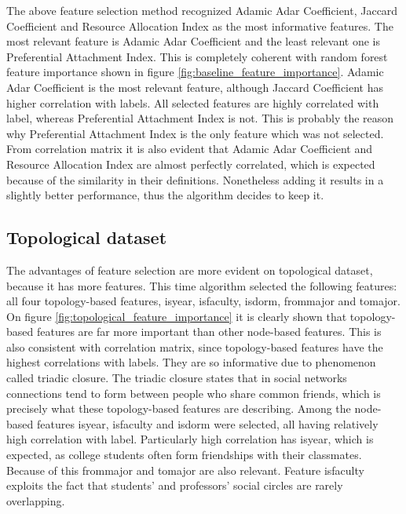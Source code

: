 \documentclass[9pt,twocolumn,twoside]{pnas-new}
\begin{document}
The above feature selection method recognized Adamic Adar Coefficient, Jaccard Coefficient and Resource Allocation Index as the most informative features. The most relevant feature is Adamic Adar Coefficient and the least relevant one is Preferential Attachment Index. This is completely coherent with random forest feature importance shown in figure \ref{fig:baseline_feature_importance}. Adamic Adar Coefficient is the most relevant feature, although Jaccard Coefficient has higher correlation with labels. All selected features are highly correlated with label, whereas Preferential Attachment Index is not. This is probably the reason why Preferential Attachment Index is the only feature which was not selected. From correlation matrix it is also evident that Adamic Adar Coefficient and Resource Allocation Index are almost perfectly correlated, which is expected because of the similarity in their definitions. Nonetheless adding it results in a slightly better performance, thus the algorithm decides to keep it. 








\subsection*{Topological dataset}

The advantages of feature selection are more evident on topological dataset, because it has more features. This time algorithm selected the following features: all four topology-based features, is\textunderscore year, is\textunderscore faculty, is\textunderscore dorm, from\textunderscore major and to\textunderscore major. On figure \ref{fig:topological_feature_importance} it is clearly shown that topology-based features are far more important than other node-based features. This is also consistent with correlation matrix, since topology-based features have the highest correlations with labels. They are so informative due to phenomenon called triadic closure. The triadic closure states that in social networks connections tend to form between people who share common friends, which is precisely what these topology-based features are describing. Among the node-based features is\textunderscore year, is\textunderscore faculty and is\textunderscore dorm were selected, all having relatively high correlation with label. Particularly high correlation has is\textunderscore year, which is expected, as college students often form friendships with their classmates. Because of this from\textunderscore major and to\textunderscore major are also relevant. Feature is\textunderscore faculty exploits the fact that students' and professors' social circles are rarely overlapping.
\end{document}
